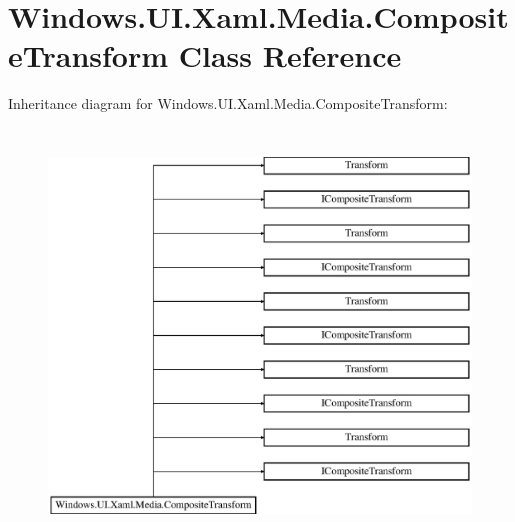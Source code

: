 \hypertarget{class_windows_1_1_u_i_1_1_xaml_1_1_media_1_1_composite_transform}{}\section{Windows.\+U\+I.\+Xaml.\+Media.\+Composite\+Transform Class Reference}
\label{class_windows_1_1_u_i_1_1_xaml_1_1_media_1_1_composite_transform}
Inheritance diagram for Windows.\+U\+I.\+Xaml.\+Media.\+Composite\+Transform\+:\begin{figure}[H]
\begin{center}
\leavevmode
\includegraphics[height=11.000000cm]{class_windows_1_1_u_i_1_1_xaml_1_1_media_1_1_composite_transform}
\end{center}
\end{figure}
